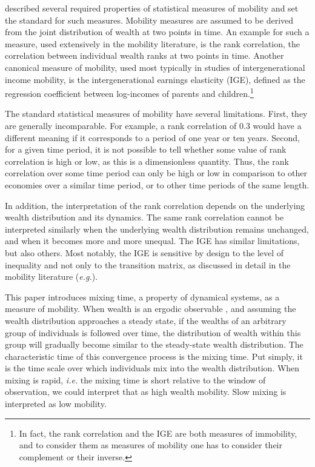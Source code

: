 \documentclass[11pt]{article}
\newcommand{\ie}{{\it i.e.}\xspace}
\newcommand{\eg}{{\it e.g.}\xspace}
\numberwithin{equation}{section}
\begin{document}
\citet{Shorrocks1978} described several required properties of statistical measures of mobility and set the standard for such measures. Mobility measures are assumed to be derived from the joint distribution of wealth at two points in time.
An example for such a measure, used extensively in the mobility literature, is the rank correlation, the correlation between individual wealth ranks at two points in time. Another canonical measure of mobility, used most typically in studies of intergenerational income mobility, is the intergenerational earnings elasticity (IGE), defined as the regression coefficient between log-incomes of parents and children.\footnote{In fact, the rank correlation and the IGE are both measures of immobility, and to consider them as measures of mobility one has to consider their complement or their inverse.}

The standard statistical measures of mobility have several limitations. First, they are generally incomparable. For example, a rank correlation of 0.3 would have a different meaning if it corresponds to a period of one year or ten years. Second, for a given time period, it is not possible to tell whether some value of rank correlation is high or low, as this is a dimensionless quantity. Thus, the rank correlation over some time period can only be high or low in comparison to other economies over a similar time period, or to other time periods of the same length.

In addition, the interpretation of the rank correlation depends on the underlying wealth distribution and its dynamics. The same rank correlation cannot be interpreted similarly when the underlying wealth distribution remains unchanged, and when it becomes more and more unequal. The IGE has similar limitations, but also others. Most notably, the IGE is sensitive by design to the level of inequality and not only to the transition matrix, as discussed in detail in the mobility literature (\eg \citet{chettyETAL2014}).

This paper introduces mixing time, a property of dynamical systems, as a measure of mobility. When wealth is an ergodic observable \citep{PetersAdamou2018c}, and assuming the wealth distribution approaches a steady state, if the wealths of an arbitrary group of individuals is followed over time, the distribution of wealth within this group will gradually become similar to the steady-state wealth distribution. The characteristic time of this convergence process is the mixing time. Put simply, it is the time scale over which individuals mix into the wealth distribution. When mixing is rapid, \ie the mixing time is short relative to the window of observation, we could interpret that as high wealth mobility. Slow mixing is interpreted as low mobility.
\end{document}
